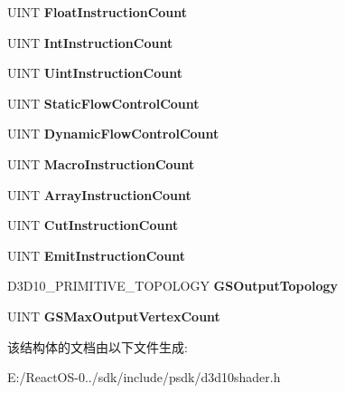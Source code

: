 \begin{DoxyCompactItemize}
U\+I\+NT {\bfseries Float\+Instruction\+Count}
\item 
\mbox{\label{struct___d3_d10___s_h_a_d_e_r___d_e_s_c_a3ea246fd1e93a28b3c82d0cad7f29ac1}} 
U\+I\+NT {\bfseries Int\+Instruction\+Count}
\item 
\mbox{\label{struct___d3_d10___s_h_a_d_e_r___d_e_s_c_a3f82bd4b5d0d1b701f4be7ee01557f57}} 
U\+I\+NT {\bfseries Uint\+Instruction\+Count}
\item 
\mbox{\label{struct___d3_d10___s_h_a_d_e_r___d_e_s_c_aa10c7ee277f8dc056e5e034560997ca5}} 
U\+I\+NT {\bfseries Static\+Flow\+Control\+Count}
\item 
\mbox{\label{struct___d3_d10___s_h_a_d_e_r___d_e_s_c_a389fbef31c1508698f3bc5a4030acbab}} 
U\+I\+NT {\bfseries Dynamic\+Flow\+Control\+Count}
\item 
\mbox{\label{struct___d3_d10___s_h_a_d_e_r___d_e_s_c_a3fdd38651618210b3df8288a7c9cd81a}} 
U\+I\+NT {\bfseries Macro\+Instruction\+Count}
\item 
\mbox{\label{struct___d3_d10___s_h_a_d_e_r___d_e_s_c_a73a296984f73ca8e253c8e211af8fedf}} 
U\+I\+NT {\bfseries Array\+Instruction\+Count}
\item 
\mbox{\label{struct___d3_d10___s_h_a_d_e_r___d_e_s_c_a7b8f49ea179e29b736d7a94a187e2109}} 
U\+I\+NT {\bfseries Cut\+Instruction\+Count}
\item 
\mbox{\label{struct___d3_d10___s_h_a_d_e_r___d_e_s_c_a534ba6a7c08ec1e38da15d685f4ac928}} 
U\+I\+NT {\bfseries Emit\+Instruction\+Count}
\item 
\mbox{\label{struct___d3_d10___s_h_a_d_e_r___d_e_s_c_a776c639777e5ce09aeeb6e6f66d1f5ed}} 
D3\+D10\+\_\+\+P\+R\+I\+M\+I\+T\+I\+V\+E\+\_\+\+T\+O\+P\+O\+L\+O\+GY {\bfseries G\+S\+Output\+Topology}
\item 
\mbox{\label{struct___d3_d10___s_h_a_d_e_r___d_e_s_c_a8b659fbcd6a00b3ed1abeeea0010bd5a}} 
U\+I\+NT {\bfseries G\+S\+Max\+Output\+Vertex\+Count}
\end{DoxyCompactItemize}


该结构体的文档由以下文件生成\+:\begin{DoxyCompactItemize}
\item 
E\+:/\+React\+O\+S-\/0../sdk/include/psdk/d3d10shader.\+h\end{DoxyCompactItemize}
